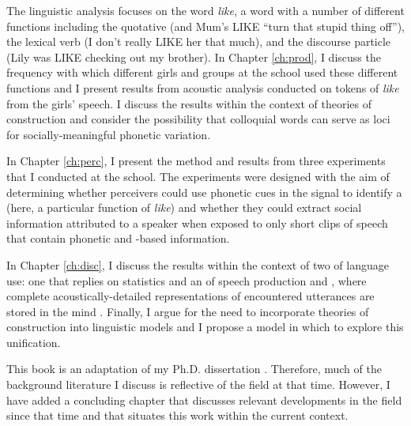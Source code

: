 The linguistic analysis focuses on the word \textit{like}, a word with a number of different functions including the quotative (and Mum's LIKE ``turn that stupid thing off''), the lexical verb (I don't really LIKE her that much), and the discourse particle (Lily was LIKE checking out my brother).  In Chapter \ref{ch:prod}, I discuss the frequency with which different girls and groups at the school used these different functions and I present results from acoustic analysis conducted on tokens of \textit{like} from the girls' speech.  I discuss the results within the context of theories of  construction and consider the possibility that colloquial words can serve as loci for socially-meaningful phonetic variation.


In Chapter \ref{ch:perc}, I present the method and results from three  experiments that I conducted at the school.  The experiments were designed with the aim of determining whether perceivers could use phonetic cues in the signal to identify a  (here, a particular function of \textit{like}) and whether they could extract social information attributed to a speaker when exposed to only short clips of speech that contain phonetic and -based information.

In Chapter \ref{ch:disc}, I discuss the results within the context of two  of language use: one that replies on  statistics \cite{jurafsky1996,narayananjurafsky2002} and an  of speech production and , where complete acoustically-detailed representations of encountered utterances are stored in the mind \cite{johnson1997,pierrehumbert2001}.  Finally, I argue for the need to incorporate theories of  construction into linguistic models and I propose a model in which to explore this unification. 


This book is an adaptation of my Ph.D. dissertation \cite{drager2009-thesis}.  Therefore, much of the background literature I discuss is reflective of the field at that time.  However, I have added a concluding chapter that discusses relevant developments in the field since that time and that situates this work within the current context.

